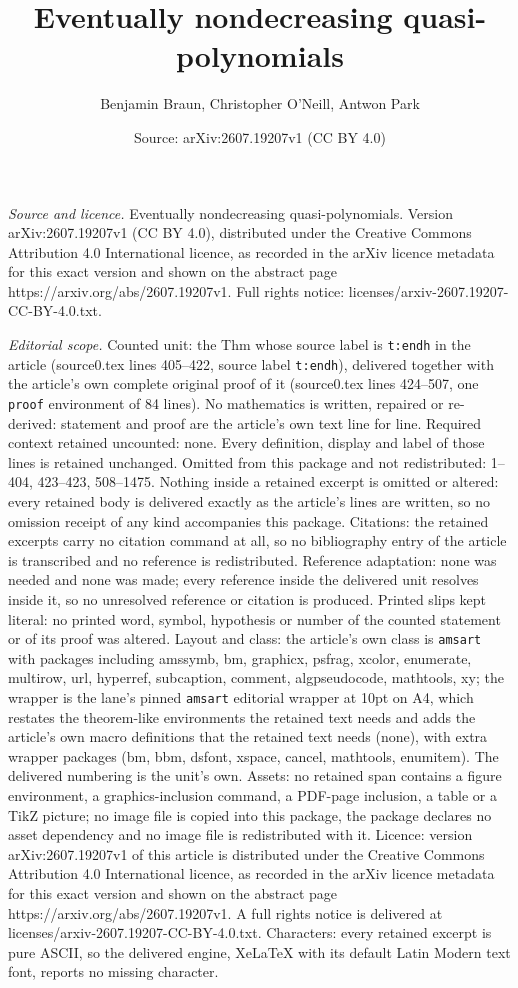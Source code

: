 \documentclass[10pt,a4paper]{amsart}
\title[Eventually nondecreasing quasi-polynomials]{Eventually nondecreasing quasi-polynomials}
\author{Benjamin Braun, Christopher O'Neill, Antwon Park}
\date{Source: arXiv:2607.19207v1 (CC BY 4.0)}
\begin{document}
\maketitle

\noindent\emph{Source and licence.} Eventually nondecreasing quasi-polynomials. Version arXiv:2607.19207v1 (CC BY 4.0), distributed under the Creative Commons Attribution 4.0 International licence, as recorded in the arXiv licence metadata for this exact version and shown on the abstract page https://arxiv.org/abs/2607.19207v1. Full rights notice: licenses/arxiv-2607.19207-CC-BY-4.0.txt.\par\smallskip

\noindent\textit{Editorial scope.} Counted unit: the Thm whose source label is \texttt{t:endh} in the article (source0.tex lines 405--422, source label \texttt{t:endh}), delivered together with the article's own complete original proof of it (source0.tex lines 424--507, one \texttt{proof} environment of 84 lines). No mathematics is written, repaired or re-derived: statement and proof are the article's own text line for line. Required context retained uncounted: none. Every definition, display and label of those lines is retained unchanged. Omitted from this package and not redistributed: 1--404, 423--423, 508--1475. Nothing inside a retained excerpt is omitted or altered: every retained body is delivered exactly as the article's lines are written, so no omission receipt of any kind accompanies this package. Citations: the retained excerpts carry no citation command at all, so no bibliography entry of the article is transcribed and no reference is redistributed. Reference adaptation: none was needed and none was made; every reference inside the delivered unit resolves inside it, so no unresolved reference or citation is produced. Printed slips kept literal: no printed word, symbol, hypothesis or number of the counted statement or of its proof was altered. Layout and class: the article's own class is \texttt{amsart} with packages including amssymb, bm, graphicx, psfrag, xcolor, enumerate, multirow, url, hyperref, subcaption, comment, algpseudocode, mathtools, xy; the wrapper is the lane's pinned \texttt{amsart} editorial wrapper at 10pt on A4, which restates the theorem-like environments the retained text needs and adds the article's own macro definitions that the retained text needs (none), with extra wrapper packages (bm, bbm, dsfont, xspace, cancel, mathtools, enumitem). The delivered numbering is the unit's own. Assets: no retained span contains a figure environment, a graphics-inclusion command, a PDF-page inclusion, a table or a TikZ picture; no image file is copied into this package, the package declares no asset dependency and no image file is redistributed with it. Licence: version arXiv:2607.19207v1 of this article is distributed under the Creative Commons Attribution 4.0 International licence, as recorded in the arXiv licence metadata for this exact version and shown on the abstract page https://arxiv.org/abs/2607.19207v1. A full rights notice is delivered at licenses/arxiv-2607.19207-CC-BY-4.0.txt. Characters: every retained excerpt is pure ASCII, so the delivered engine, XeLaTeX with its default Latin Modern text font, reports no missing character.
\end{document}
